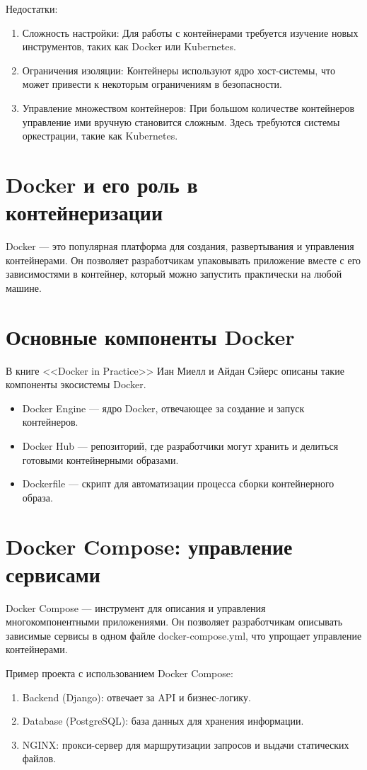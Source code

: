Недостатки:
\begin{enumerate}
    \item Сложность настройки: Для работы с контейнерами требуется изучение новых инструментов, таких как Docker или Kubernetes.
    \item Ограничения изоляции: Контейнеры используют ядро хост-системы, что может привести к некоторым ограничениям в безопасности.
    \item Управление множеством контейнеров: При большом количестве контейнеров управление ими вручную становится сложным. Здесь требуются системы оркестрации, такие как Kubernetes.
\end{enumerate}

\section{Docker и его роль в контейнеризации}
Docker — это популярная платформа для создания, развертывания и управления контейнерами. Он позволяет разработчикам упаковывать приложение вместе с его зависимостями в контейнер, который можно запустить практически на любой машине. 

\section{Основные компоненты Docker}
В книге <<Docker in Practice>> Иан Миелл и Айдан Сэйерс описаны такие компоненты экосистемы Docker\cite{miell2019docker}.
\begin{itemize}
    \item Docker Engine — ядро Docker, отвечающее за создание и запуск контейнеров.
    \item Docker Hub — репозиторий, где разработчики могут хранить и делиться готовыми контейнерными образами.
    \item Dockerfile — скрипт для автоматизации процесса сборки контейнерного образа.
\end{itemize}

\section{Docker Compose: управление сервисами}
Docker Compose — инструмент для описания и управления многокомпонентными приложениями. Он позволяет разработчикам описывать зависимые сервисы в одном файле docker-compose.yml, что упрощает управление контейнерами.

Пример проекта с использованием Docker Compose:
\begin{enumerate}
    \item Backend (Django): отвечает за API и бизнес-логику.
    \item Database (PostgreSQL): база данных для хранения информации.
    \item NGINX: прокси-сервер для маршрутизации запросов и выдачи статических файлов.
\end{enumerate}

